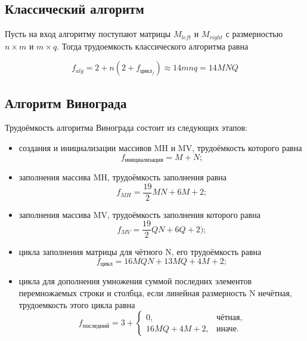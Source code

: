 \subsection{Классический алгоритм}

Пусть на вход алгоритму поступают матрицы $M_{left}$ и $M_{right}$ с размерностью $n \times m$ и $m \times q$. Тогда трудоемкость классического алгоритма равна

\begin{equation}\label{math:alg}
	f_{alg} = 2 + n\left(2 + f_{цикл_j}\right) \approx 14mnq = 14MNQ
\end{equation}
\subsection{Алгоритм Винограда}

Трудоёмкость алгоритма Винограда состоит из следующих этапов:
\begin{itemize}
	\item создания и инициализации массивов MH и MV, трудоёмкость которого равна
	\begin{equation}
		\label{for:init}
		f_{инициализация} = M + N;
	\end{equation}
	
	\item заполнения массива MH, трудоёмкость заполнения  равна
	\begin{equation}
		\label{for:MH}
		f_{MH} = \frac{19}{2}MN +6M +2;
	\end{equation}
	
	\item заполнения массива MV, трудоёмкость заполнения которого равна
	\begin{equation}
		\label{for:MV}
		f_{MV} = \frac{19}{2}QN +6Q +2);
	\end{equation}
	
	\item цикла заполнения матрицы для чётного N, его трудоёмкость равна
	\begin{equation}
		\label{for:cycle}
		f_{\text{цикл}} = 16MQN + 13MQ + 4M + 2;
	\end{equation}
	
	\item цикла для дополнения умножения суммой последних элементов перемножаемых строки и столбца, если линейная размерность N нечётная, трудоемкость этого цикла равна
	\begin{equation}
		\label{for:last}
		f_{\text{последний}} = 3 + \begin{cases}
			0, & \text{чётная,}\\
			16MQ + 4M + 2, & \text{иначе.}
		\end{cases}
	\end{equation}
\end{itemize}

